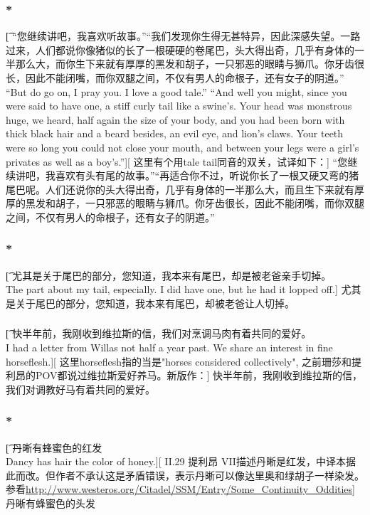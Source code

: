 \documentclass[12pt,a4paper]{article}
\begin{document}
\subsubsection{\color{red}*}\t[
	“您继续讲吧，我喜欢听故事。”“我们发现你生得无甚特异，因此深感失望。一路过来，人们都说你像猪似的长了一根硬硬的卷尾巴，头大得出奇，几乎有身体的一半那么大，而你生下来就有厚厚的黑发和胡子，一只邪恶的眼睛与狮爪。你牙齿很长，因此不能闭嘴，而你双腿之间，不仅有男人的命根子，还有女子的阴道。”\\
	“But do go on, I pray you. I love a good tale.” “And well you might, since you were said to have one, a stiff curly tail like a swine's. Your head was monstrous huge, we heard, half again the size of your body, and you had been born with thick black hair and a beard besides, an evil eye, and lion's claws. Your teeth were so long you could not close your mouth, and between your legs were a girl's privates as well as a boy's.”][
	这里有个用tale tail同音的双关，试译如下：]
	“您继续讲吧，我喜欢有头有尾的故事。”“再适合你不过，听说你长了一根又硬又弯的猪尾巴呢。人们还说你的头大得出奇，几乎有身体的一半那么大，而且生下来就有厚厚的黑发和胡子，一只邪恶的眼睛与狮爪。你牙齿很长，因此不能闭嘴，而你双腿之间，不仅有男人的命根子，还有女子的阴道。”
	
\subsubsection{\color{red}*}\t[
	尤其是关于尾巴的部分，您知道，我本来有尾巴，却是被老爸亲手切掉。\\
	The part about my tail, especially. I did have one, but he had it lopped off.]
	尤其是关于尾巴的部分，您知道，我本来有尾巴，却被老爸让人切掉。
	
\subsubsection{}\t[	
	 快半年前，我刚收到维拉斯的信，我们对烹调马肉有着共同的爱好。\\
	 I had a letter from Willas not half a year past. We share an interest in fine horseflesh.][
	 这里horseflesh指的当是"horses considered collectively", 之前珊莎和提利昂的POV都说过维拉斯爱好养马。新版作：]
	 快半年前，我刚收到维拉斯的信，我们对调教好马有着共同的爱好。
	 
\subsubsection{\color{red}*}\t[
	丹晰有蜂蜜色的红发\\
	Dancy has hair the color of honey.][
	II.29 提利昂 VII描述丹晰是红发，中译本据此而改。但作者不承认这是矛盾错误，表示丹晰可以像达里奥和绿胡子一样染发。参看\url{http://www.westeros.org/Citadel/SSM/Entry/Some_Continuity_Oddities}]
	丹晰有蜂蜜色的头发
	 
\end{document}
